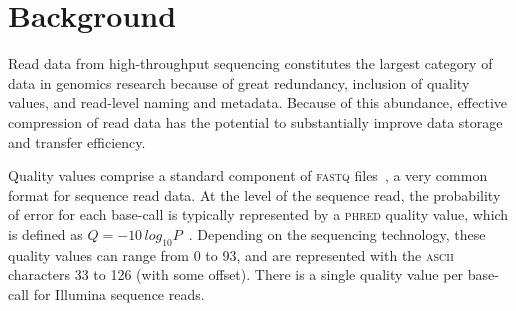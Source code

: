 \documentclass{bmcart}
\begin{document}


\section*{Background}
Read data from high-throughput sequencing constitutes the largest
category of data in genomics research because of great redundancy,
inclusion of quality values, and read-level naming and
metadata. Because of this abundance, effective compression of read
data has the potential to substantially improve data storage and
transfer efficiency.

Quality values comprise a standard component of \textsc{fastq}
files~\cite{Cock:2010ve}, a very common format for sequence read
data. At the level of the sequence read, the probability of error for
each base-call is typically represented by a \textsc{phred} quality
value, which is defined as $Q =
-10\,log_{10}P$~\cite{Ewing:1998ly}. Depending on the sequencing
technology, these quality values can range from 0 to 93, and are
represented with the \textsc{ascii} characters 33 to 126 (with some
offset). There is a single quality value per base-call for Illumina
sequence reads.
\end{document}
